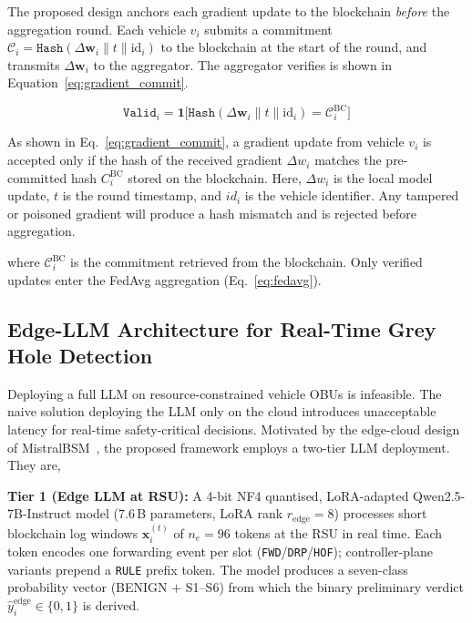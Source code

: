 \documentclass[12pt, a4paper]{report}
\begin{document}
The proposed design anchors each gradient update to the blockchain
\emph{before} the aggregation round. Each vehicle $v_i$ submits a
commitment $\mathcal{C}_i = \texttt{Hash}(\Delta\mathbf{w}_i \| t \| \mathrm{id}_i)$
to the blockchain at the start of the round, and transmits
$\Delta\mathbf{w}_i$ to the aggregator. The aggregator verifies is shown in Equation~\eqref{eq:gradient_commit}.

\begin{equation}
\label{eq:gradient_commit}
\texttt{Valid}_i = \mathbf{1}\bigl[
\texttt{Hash}(\Delta\mathbf{w}_i \| t \| \mathrm{id}_i) =
\mathcal{C}_i^{\mathrm{BC}}
\bigr]
\end{equation}

As shown in Eq.~\eqref{eq:gradient_commit}, a gradient update from vehicle $v_i$ is accepted only if the hash of the received gradient $\Delta w_i$ matches the pre-committed hash $C_i^{\text{BC}}$ stored on the blockchain. Here, $\Delta w_i$ is the local model update, $t$ is the round timestamp, and $id_i$ is the vehicle identifier. Any tampered or poisoned gradient will produce a hash mismatch and is rejected before aggregation.

\noindent where $\mathcal{C}_i^{\mathrm{BC}}$ is the commitment retrieved
from the blockchain. Only verified updates enter the FedAvg aggregation
(Eq.~\eqref{eq:fedavg}).

\subsection{Edge-LLM Architecture for Real-Time Grey Hole Detection}

Deploying a full LLM on resource-constrained vehicle OBUs is infeasible.
The naive solution deploying the LLM only on the cloud introduces
unacceptable latency for real-time safety-critical decisions. Motivated
by the edge-cloud design of MistralBSM~\cite{hamhoum2024mistralbsm},
the proposed framework employs a two-tier LLM deployment. They are,

\textbf{Tier 1 (Edge LLM at RSU):} A 4-bit NF4 quantised,
LoRA-adapted Qwen2.5-7B-Instruct model (7.6\,B parameters,
LoRA rank $r_{\text{edge}}=8$) processes short blockchain log
windows $\mathbf{x}_i^{(t)}$ of $n_e = 96$ tokens at the RSU
in real time. Each token encodes one forwarding event per slot
(\texttt{FWD}/\texttt{DRP}/\texttt{HOF}); controller-plane
variants prepend a \texttt{RULE} prefix token. The model
produces a seven-class probability vector (BENIGN $+$ S1--S6)
from which the binary preliminary verdict
$\hat{y}_i^{\mathrm{edge}} \in \{0,1\}$ is derived.
\end{document}
